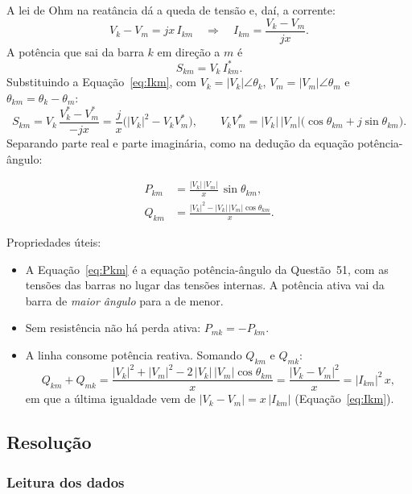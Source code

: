 \documentclass[a4paper,11pt]{article}
\numberwithin{equation}{section}
\numberwithin{figure}{section}
\numberwithin{table}{section}
\begin{document}
A lei de Ohm na reatância dá a queda de tensão e, daí, a corrente:
\begin{equation}
  V_k - V_m = jx\,I_{km}
  \quad\Longrightarrow\quad
  I_{km} = \frac{V_k - V_m}{jx}.
  \label{eq:Ikm}
\end{equation}
A potência que sai da barra $k$ em direção a $m$ é
\begin{equation}
  S_{km} = V_k\,I_{km}^{*}.
  \label{eq:Skm}
\end{equation}
Substituindo a Equação~\eqref{eq:Ikm}, com $V_k = |V_k|\angle\theta_k$,
$V_m = |V_m|\angle\theta_m$ e $\theta_{km} = \theta_k - \theta_m$:
\[
  S_{km} = V_k\,\frac{V_k^{*} - V_m^{*}}{-jx}
         = \frac{j}{x}\bigl(|V_k|^{2} - V_k V_m^{*}\bigr),
  \qquad
  V_k V_m^{*} = |V_k|\,|V_m|\bigl(\cos\theta_{km} + j\sin\theta_{km}\bigr).
\]
Separando parte real e parte imaginária, como na dedução da equação
potência-ângulo:
\begin{conceito}[title=Fluxo numa linha sem perdas]
  \begin{align}
    P_{km} &= \frac{|V_k|\,|V_m|}{x}\,\sin\theta_{km}, \label{eq:Pkm}\\
    Q_{km} &= \frac{|V_k|^{2} - |V_k|\,|V_m|\cos\theta_{km}}{x}. \label{eq:Qkm}
  \end{align}
\end{conceito}

Propriedades úteis:
\begin{itemize}
  \item A Equação~\eqref{eq:Pkm} é a equação potência-ângulo da
        Questão~51, com as tensões das barras no lugar das tensões internas.
        A potência ativa vai da barra de \emph{maior ângulo} para a de menor.
  \item Sem resistência não há perda ativa: $P_{mk} = -P_{km}$.
  \item A linha consome potência reativa. Somando $Q_{km}$ e $Q_{mk}$:
        \[
          Q_{km} + Q_{mk}
          = \frac{|V_k|^{2} + |V_m|^{2} - 2\,|V_k|\,|V_m|\cos\theta_{km}}{x}
          = \frac{|V_k - V_m|^{2}}{x}
          = |I_{km}|^{2}\,x ,
        \]
        em que a última igualdade vem de $|V_k - V_m| = x\,|I_{km}|$
        (Equação~\eqref{eq:Ikm}).
\end{itemize}

\subsection{Resolução}

\subsubsection{Leitura dos dados}
\end{document}
